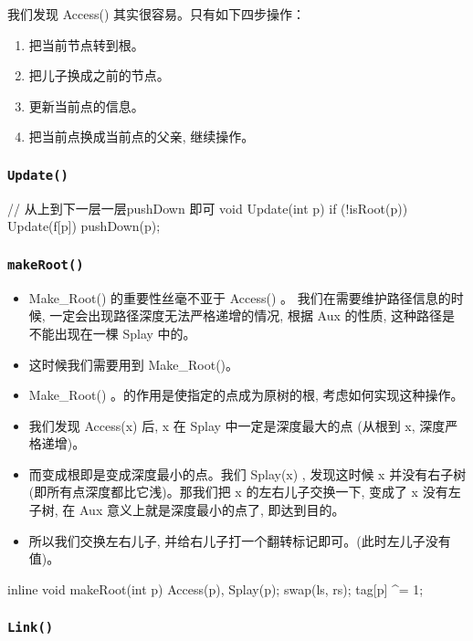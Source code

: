 我们发现 Access() 其实很容易。只有如下四步操作：

\begin{enumerate}
\item 把当前节点转到根。
\item 把儿子换成之前的节点。
\item 更新当前点的信息。
\item 把当前点换成当前点的父亲, 继续操作。
\end{enumerate}

\subsubsection{\texttt{Update()}}

\begin{cppcode}
// 从上到下一层一层pushDown 即可
void Update(int p) {
  if (!isRoot(p)) Update(f[p]) pushDown(p);
}
\end{cppcode}

\subsubsection{\texttt{makeRoot()}}

\begin{itemize}
\item Make\_Root() 的重要性丝毫不亚于 Access() 。 我们在需要维护路径信息的时候, 一定会出现路径深度无法严格递增的情况, 根据 Aux 的性质, 这种路径是不能出现在一棵 Splay 中的。
\item 这时候我们需要用到 Make\_Root()。
\item Make\_Root() 。的作用是使指定的点成为原树的根, 考虑如何实现这种操作。
\item 我们发现 Access(x) 后,  x 在 Splay 中一定是深度最大的点 (从根到 x, 深度严格递增)。
\item 而变成根即是变成深度最小的点。我们 Splay(x) , 发现这时候 x 并没有右子树 (即所有点深度都比它浅)。那我们把 x 的左右儿子交换一下, 变成了 x 没有左子树, 在 Aux 意义上就是深度最小的点了, 即达到目的。
\item 所以我们交换左右儿子, 并给右儿子打一个翻转标记即可。(此时左儿子没有值)。
\end{itemize}

\begin{cppcode}
inline void makeRoot(int p) {
  Access(p), Splay(p);
  swap(ls, rs);
  tag[p] ^= 1;
}
\end{cppcode}

\subsubsection{\texttt{Link()}}

